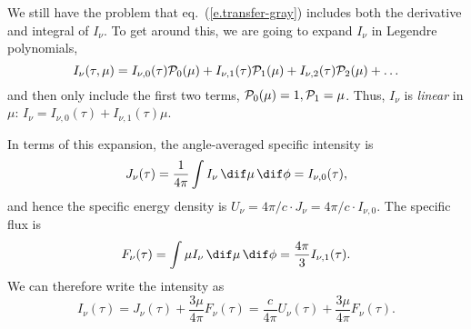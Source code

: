 We still have the problem that eq.~(\ref{e.transfer-gray}) includes both the derivative and integral of $I_{\nu}$. To get around this, we are going to expand $I_{\nu}$ in Legendre polynomials,
\[
	I_{\nu}(\tau,\mu) = I_{\nu,0}(\tau)\mathcal{P}_{0}(\mu) + I_{\nu,1}(\tau)\mathcal{P}_{1}(\mu) + I_{\nu,2}(\tau)\mathcal{P}_{2}(\mu) + \ldots
\]
and then only include the first two terms, $\mathcal{P}_{0}(\mu) = 1, \mathcal{P}_{1} = \mu$. Thus, $I_{\nu}$ is \emph{linear} in $\mu$: $I_{\nu} = I_{\nu,0}(\tau) + I_{\nu,1}(\tau)\mu$. 

In terms of this expansion, the angle-averaged specific intensity is
\[
	J_{\nu}(\tau) = \frac{1}{4\pi}\int I_{\nu}\,\dif\mu\,\dif\phi = I_{\nu,0}(\tau),
\]
and hence the specific energy density is $U_{\nu} = 4\pi/c\cdot J_{\nu} = 4\pi/c\cdot I_{\nu,0}$. The specific flux is
\[
	F_{\nu}(\tau) = \int \mu I_{\nu}\,\dif\mu\,\dif\phi = \frac{4\pi}{3} I_{\nu,1}(\tau).
\]
We can therefore write the intensity as
\begin{equation}
\label{e.intensity-expanded}
I_{\nu}(\tau) = J_{\nu}(\tau) + \frac{3\mu}{4\pi} F_{\nu}(\tau) = \frac{c}{4\pi}U_{\nu}(\tau) + \frac{3\mu}{4\pi} F_{\nu}(\tau).
\end{equation}

